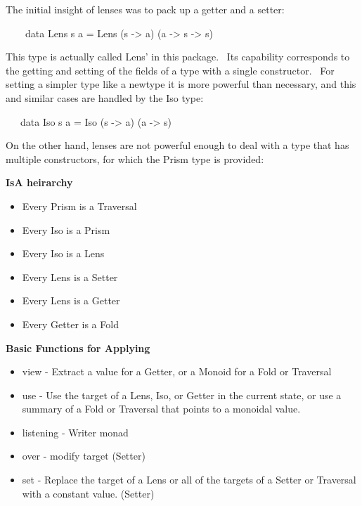 \documentclass[a4paper]{article}
\title{}
\author{}
\date{}
\newcommand\liststyleWWNumiii{%
\renewcommand\labelitemi{${\bullet}$}
\renewcommand\labelitemii{${\circ}$}
\renewcommand\labelitemiii{${\blacksquare}$}
\renewcommand\labelitemiv{${\bullet}$}
}
\newcommand\liststyleWWNumv{%
\renewcommand\labelitemi{${\bullet}$}
\renewcommand\labelitemii{${\circ}$}
\renewcommand\labelitemiii{${\blacksquare}$}
\renewcommand\labelitemiv{${\bullet}$}
}
\begin{document}
\clearpage\setcounter{page}{1}\pagestyle{Standard}

The initial insight of lenses was to pack up a getter and a setter:


\bigskip

\ \ \ \ data Lens s a = Lens (s -{\textgreater} a) (a -{\textgreater} s
-{\textgreater} s)


\bigskip

This type is actually called Lens{\textquoteright} in this package.
\ Its capability corresponds to the getting and setting of the fields
of a type with a single constructor. \ For setting a simpler type like
a newtype it is more powerful than necessary, and this and similar
cases are handled by the Iso type:


\bigskip

\ \ \ data Iso s a = Iso (s -{\textgreater} a) (a -{\textgreater} s)


\bigskip

On the other hand, lenses are not powerful enough to deal with a type
that has multiple constructors, for which the Prism type is provided:


\bigskip

\textbf{IsA heirarchy}


\bigskip

\liststyleWWNumiii
\begin{itemize}
\item Every Prism is a Traversal
\item Every Iso is a Prism
\item Every Iso is a Lens
\item Every Lens is a Setter
\item Every Lens is a Getter
\item Every Getter is a Fold
\end{itemize}

\bigskip

\textbf{Basic Functions for Applying}


\bigskip

\liststyleWWNumv
\begin{itemize}
\item view {}- Extract a value for a Getter, or a Monoid for a Fold or
Traversal
\item use - Use the target of a Lens, Iso, or Getter in the current
state, or use a summary of a Fold or Traversal that points to a
monoidal value.
\item listening - Writer monad
\item over - modify target (Setter)
\item set - Replace the target of a Lens or all of the targets of a
Setter or Traversal with a constant value. (Setter)
\end{itemize}
\end{document}
